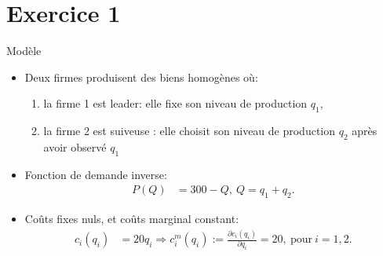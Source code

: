 \begin{frame}
\titlepage
\end{frame}



\section{Exercice 1}
\frame{\sectionpage}

\begin{frame}[allowframebreaks]{Modèle}
\begin{itemize}
\item Deux firmes produisent des biens homogènes où: 
\begin{enumerate}[-]
\item la firme 1 est leader:  elle fixe son niveau de production $q_1$,
\item la firme 2 est suiveuse : elle choisit son niveau de production $q_2$ après avoir observé $q_1$
\end{enumerate}
\item Fonction de demande inverse: 
\begin{align}
    P(Q) &= 300 - Q, \ Q=q_1+q_2.
\label{eq1}
\end{align}
\item Coûts fixes nuls, et coûts marginal constant:
\begin{align}
    c_i(q_i) &= 20q_i \Rightarrow c^{m}_i(q_i) :=\frac{\partial c_i(q_i)}{\partial q_i} = 20, \ \text{pour} \ i= 1, 2.
    \label{eq2}
\end{align}
\end{itemize}
\end{frame}

